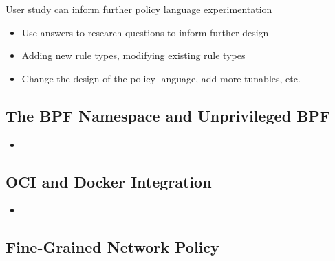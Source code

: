 \begin{inprogress}
  User study can inform further policy language experimentation
  \begin{itemize}
    \item Use answers to research questions to inform further design
    \item Adding new rule types, modifying existing rule types
    \item Change the design of the policy language, add more tunables, etc.
  \end{itemize}
\end{inprogress}

\subsection{The BPF Namespace and Unprivileged BPF}

\begin{inprogress}
  \begin{itemize}
    \item
  \end{itemize}
\end{inprogress}

\subsection{OCI and Docker Integration}

\begin{inprogress}
  \begin{itemize}
    \item
  \end{itemize}
\end{inprogress}

\subsection{Fine-Grained Network Policy}

